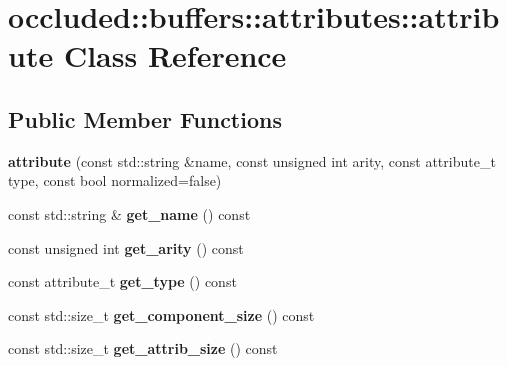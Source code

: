 \hypertarget{classoccluded_1_1buffers_1_1attributes_1_1attribute}{\section{occluded\+:\+:buffers\+:\+:attributes\+:\+:attribute Class Reference}
\label{classoccluded_1_1buffers_1_1attributes_1_1attribute}
}
\subsection*{Public Member Functions}
\begin{DoxyCompactItemize}
\item 
\hypertarget{classoccluded_1_1buffers_1_1attributes_1_1attribute_a31868f0f2c3714b048bde8aca537755e}{{\bfseries attribute} (const std\+::string \&name, const unsigned int arity, const attribute\+\_\+t type, const bool normalized=false)}\label{classoccluded_1_1buffers_1_1attributes_1_1attribute_a31868f0f2c3714b048bde8aca537755e}

\item 
\hypertarget{classoccluded_1_1buffers_1_1attributes_1_1attribute_a883bbea2242dd4f81a8bd6edde01d956}{const std\+::string \& {\bfseries get\+\_\+name} () const }\label{classoccluded_1_1buffers_1_1attributes_1_1attribute_a883bbea2242dd4f81a8bd6edde01d956}

\item 
\hypertarget{classoccluded_1_1buffers_1_1attributes_1_1attribute_a4ea58b1332778b6936234a53d73543d5}{const unsigned int {\bfseries get\+\_\+arity} () const }\label{classoccluded_1_1buffers_1_1attributes_1_1attribute_a4ea58b1332778b6936234a53d73543d5}

\item 
\hypertarget{classoccluded_1_1buffers_1_1attributes_1_1attribute_a1b1c4b6762664a2d8ef5f410e3bf2545}{const attribute\+\_\+t {\bfseries get\+\_\+type} () const }\label{classoccluded_1_1buffers_1_1attributes_1_1attribute_a1b1c4b6762664a2d8ef5f410e3bf2545}

\item 
\hypertarget{classoccluded_1_1buffers_1_1attributes_1_1attribute_a012ea3f8aa212784b7bb7d0cd8b490b9}{const std\+::size\+\_\+t {\bfseries get\+\_\+component\+\_\+size} () const }\label{classoccluded_1_1buffers_1_1attributes_1_1attribute_a012ea3f8aa212784b7bb7d0cd8b490b9}

\item 
\hypertarget{classoccluded_1_1buffers_1_1attributes_1_1attribute_a7c99ea65b61108b80e935f985cb125a2}{const std\+::size\+\_\+t {\bfseries get\+\_\+attrib\+\_\+size} () const }\label{classoccluded_1_1buffers_1_1attributes_1_1attribute_a7c99ea65b61108b80e935f985cb125a2}


\end{DoxyCompactItemize}
